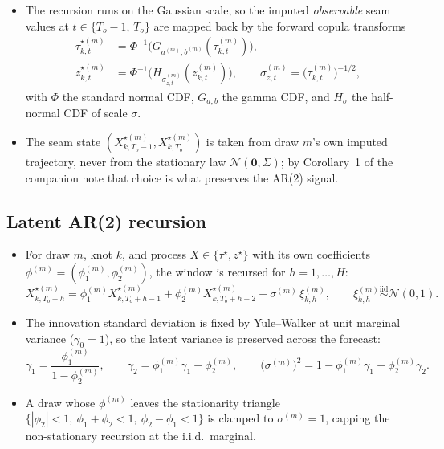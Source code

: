 \documentclass[11pt]{article}
\newcommand{\Norm}{\mathcal{N}}
\begin{document}
\begin{itemize}[leftmargin=1.4em]
  \item The recursion runs on the Gaussian scale, so the imputed
        \emph{observable} seam values at $t\in\{T_o-1,\,T_o\}$ are
        mapped back by the forward copula transforms
        \begin{align}
          \tau^{\star(m)}_{k,t}
            &= \Phi^{-1}\!\big(G_{a^{(m)},b^{(m)}}(\tau^{(m)}_{k,t})\big),
          \label{eq:fwd-tau}\\
          z^{\star(m)}_{k,t}
            &= \Phi^{-1}\!\big(H_{\sigma^{(m)}_{z,t}}(z^{(m)}_{k,t})\big),
          \qquad
          \sigma^{(m)}_{z,t} = \big(\tau^{(m)}_{k,t}\big)^{-1/2},
          \label{eq:fwd-z}
        \end{align}
        with $\Phi$ the standard normal CDF, $G_{a,b}$ the gamma CDF,
        and $H_\sigma$ the half-normal CDF of scale $\sigma$.
  \item The seam state $(X^{\star(m)}_{k,T_o-1},X^{\star(m)}_{k,T_o})$
        is taken from draw $m$'s own imputed trajectory, never from the
        stationary law $\Norm(\bm 0,\Sigma)$; by Corollary~1 of the
        companion note that choice is what preserves the AR(2) signal.
\end{itemize}

\subsection{Latent AR(2) recursion}

\begin{itemize}[leftmargin=1.4em]
  \item For draw $m$, knot $k$, and process $X\in\{\tau^\star,z^\star\}$
        with its own coefficients
        $\phi^{(m)}=(\phi^{(m)}_1,\phi^{(m)}_2)$, the window is recursed
        for $h=1,\dots,H$:
        \begin{equation}
          X^{\star(m)}_{k,T_o+h}
          = \phi^{(m)}_1 X^{\star(m)}_{k,T_o+h-1}
          + \phi^{(m)}_2 X^{\star(m)}_{k,T_o+h-2}
          + \sigma^{(m)}\,\xi^{(m)}_{k,h},
          \qquad
          \xi^{(m)}_{k,h}\overset{\text{iid}}{\sim}\Norm(0,1).
          \label{eq:recurse}
        \end{equation}
  \item The innovation standard deviation is fixed by Yule--Walker at
        unit marginal variance ($\gamma_0=1$), so the latent variance
        is preserved across the forecast:
        \begin{equation}
          \gamma_1 = \frac{\phi^{(m)}_1}{1-\phi^{(m)}_2},
          \qquad
          \gamma_2 = \phi^{(m)}_1\gamma_1 + \phi^{(m)}_2,
          \qquad
          \big(\sigma^{(m)}\big)^2
            = 1 - \phi^{(m)}_1\gamma_1 - \phi^{(m)}_2\gamma_2 .
          \label{eq:yw}
        \end{equation}
  \item A draw whose $\phi^{(m)}$ leaves the stationarity triangle
        $\{|\phi_2|<1,\ \phi_1+\phi_2<1,\ \phi_2-\phi_1<1\}$ is clamped
        to $\sigma^{(m)}=1$, capping the non-stationary recursion at the
        i.i.d.\ marginal.
\end{itemize}
\end{document}
